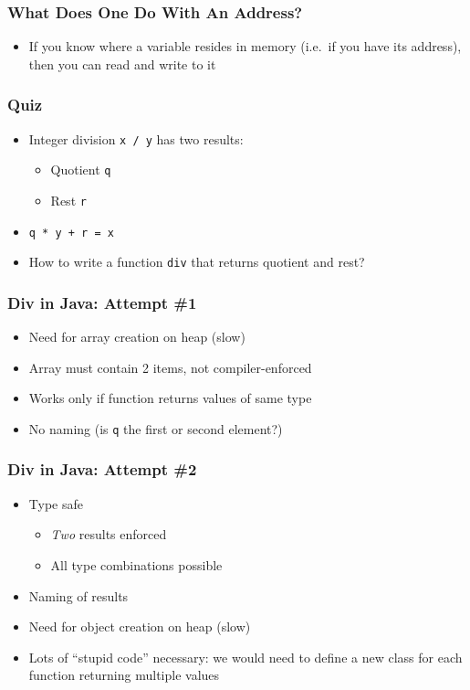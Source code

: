 \documentclass{../ucll-slides}
\newenvironment{procontralist}{
  \begingroup
  \newcommand{\pro}{\item[\Checkmark]}
  \newcommand{\con}{\item[\XSolidBrush]}
  \begin{itemize}
  }{
  \end{itemize}
  \endgroup}
\begin{document}
\begin{frame}
  \frametitle{What Does One Do With An Address?}
  \begin{itemize}
  \item If you know where a variable resides in memory
        (i.e.\ if you have its address), then you can read and write to it
  \end{itemize}
  \vskip1cm
\end{frame}

\begin{frame}
  \frametitle{Quiz}
  \begin{itemize}
    \item Integer division {\tt x / y} has two results:
          \begin{itemize}
            \item Quotient {\tt q}
            \item Rest {\tt r}
          \end{itemize}
    \item {\tt q * y + r = x}
    \item How to write a function {\tt div} that returns quotient and rest?
  \end{itemize}
\end{frame}

\begin{frame}
  \frametitle{Div in Java: Attempt \#1}
  \vskip5mm
  \begin{procontralist}
    \con<2-> Need for array creation on heap (slow)
    \con<2-> Array must contain 2 items, not compiler-enforced
    \con<2-> Works only if function returns values of same type
    \con<2-> No naming (is {\tt q} the first or second element?)
  \end{procontralist}
\end{frame}

\begin{frame}
  \frametitle{Div in Java: Attempt \#2}
  \begin{procontralist}
    \pro<2-> Type safe
             \begin{itemize}
               \item \emph{Two} results enforced
               \item All type combinations possible
             \end{itemize}
    \pro<2-> Naming of results
    \con<2-> Need for object creation on heap (slow)
    \con<2-> Lots of ``stupid code'' necessary: we would need to define a new class for each function returning multiple values
  \end{procontralist}
\end{frame}
\end{document}
